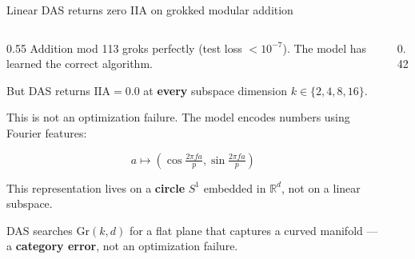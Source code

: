 \documentclass[aspectratio=169,11pt]{beamer}
\newcommand{\Gr}{\mathrm{Gr}}
\newcommand{\IIA}{\mathrm{IIA}}
\newcommand{\R}{\mathbb{R}}
\begin{document}
\begin{frame}{Linear DAS returns zero IIA on grokked modular addition}

\begin{columns}[T]
\begin{column}{0.55\textwidth}
{\small Addition mod 113 groks perfectly (test loss $< 10^{-7}$). The model has learned the correct algorithm.}

\vspace{0.3em}
{\small But DAS returns $\IIA = 0.0$ at \textbf{every} subspace dimension $k \in \{2, 4, 8, 16\}$.}

\vspace{0.3em}
{\small This is not an optimization failure. The model encodes numbers using Fourier features:}

$$a \mapsto (\cos \tfrac{2\pi f a}{p}, \sin \tfrac{2\pi f a}{p})$$

{\small This representation lives on a \textbf{circle} $S^1$ embedded in $\R^d$, not on a linear subspace.}

\vspace{0.3em}
{\small DAS searches $\Gr(k,d)$ for a flat plane that captures a curved manifold --- a \textbf{category error}, not an optimization failure.}
\end{column}
\begin{column}{0.42\textwidth}
\end{column}
\end{columns}
\end{frame}
\end{document}

